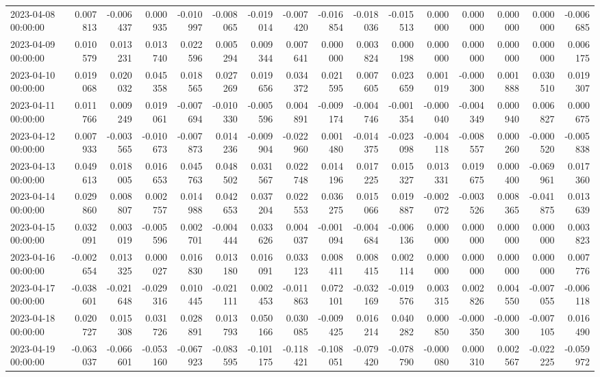 \begin{tabular}{lrrrrrrrrrrrrrrr}
2023-04-08 00:00:00 & 0.007813 & -0.006437 & 0.000935 & -0.010997 & -0.008065 & -0.019014 & -0.007420 & -0.016854 & -0.018036 & -0.015513 & 0.000000 & 0.000000 & 0.000000 & 0.000000 & -0.006685 \\
2023-04-09 00:00:00 & 0.010579 & 0.013231 & 0.013740 & 0.022596 & 0.005294 & 0.009344 & 0.007641 & 0.000000 & 0.003824 & 0.000198 & 0.000000 & 0.000000 & 0.000000 & 0.000000 & 0.006175 \\
2023-04-10 00:00:00 & 0.019068 & 0.020032 & 0.045358 & 0.018565 & 0.027269 & 0.019656 & 0.034372 & 0.021595 & 0.007605 & 0.023659 & 0.001019 & -0.000300 & 0.001888 & 0.030510 & 0.019307 \\
2023-04-11 00:00:00 & 0.011766 & 0.009249 & 0.019061 & -0.007694 & -0.010330 & -0.005596 & 0.004891 & -0.009174 & -0.004746 & -0.001354 & -0.000040 & -0.004349 & 0.000940 & 0.006827 & 0.000675 \\
2023-04-12 00:00:00 & 0.007933 & -0.003565 & -0.010673 & -0.007873 & 0.014236 & -0.009904 & -0.022960 & 0.001480 & -0.014375 & -0.023098 & -0.004118 & -0.008557 & 0.000260 & -0.000520 & -0.005838 \\
2023-04-13 00:00:00 & 0.049613 & 0.018005 & 0.016653 & 0.045763 & 0.048502 & 0.031567 & 0.022748 & 0.014196 & 0.017225 & 0.015327 & 0.013331 & 0.019675 & 0.000400 & -0.069961 & 0.017360 \\
2023-04-14 00:00:00 & 0.029860 & 0.008807 & 0.002757 & 0.014988 & 0.042653 & 0.037204 & 0.022553 & 0.036275 & 0.015066 & 0.019887 & -0.002072 & -0.003526 & 0.008365 & -0.041875 & 0.013639 \\
2023-04-15 00:00:00 & 0.032091 & 0.003019 & -0.005596 & 0.002701 & -0.004444 & 0.033626 & 0.004037 & -0.001094 & -0.004684 & -0.006136 & 0.000000 & 0.000000 & 0.000000 & 0.000000 & 0.003823 \\
2023-04-16 00:00:00 & -0.002654 & 0.013325 & 0.000027 & 0.016830 & 0.013180 & 0.016091 & 0.033123 & 0.008411 & 0.008415 & 0.002114 & 0.000000 & 0.000000 & 0.000000 & 0.000000 & 0.007776 \\
2023-04-17 00:00:00 & -0.038601 & -0.021648 & -0.029316 & 0.010445 & -0.021111 & 0.002453 & -0.011863 & 0.072101 & -0.032169 & -0.019576 & 0.003315 & 0.002826 & 0.004550 & -0.007055 & -0.006118 \\
2023-04-18 00:00:00 & 0.020727 & 0.015308 & 0.031726 & 0.028891 & 0.013793 & 0.050166 & 0.030085 & -0.009425 & 0.016214 & 0.040282 & 0.000850 & -0.000350 & -0.000300 & -0.007105 & 0.016490 \\
2023-04-19 00:00:00 & -0.063037 & -0.066601 & -0.053160 & -0.067923 & -0.083595 & -0.101175 & -0.118421 & -0.108051 & -0.079420 & -0.078790 & -0.000080 & 0.000310 & 0.002567 & -0.022225 & -0.059972 \\

\end{tabular}
